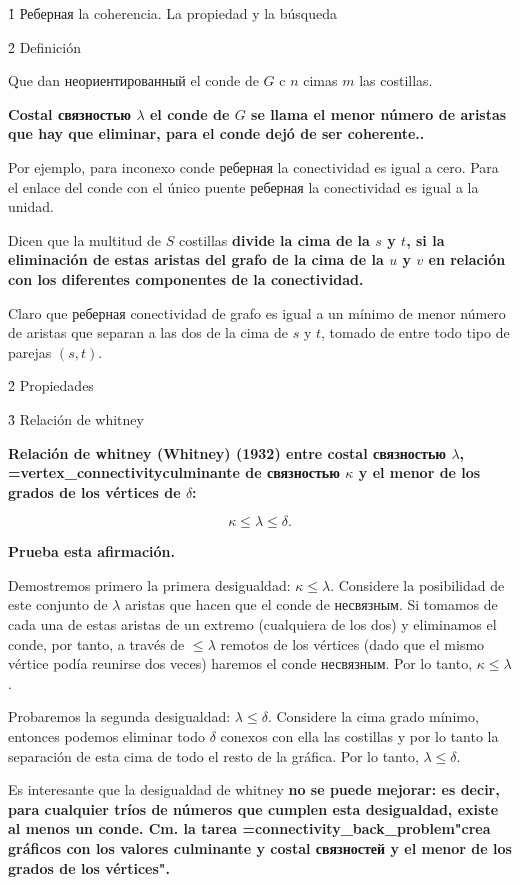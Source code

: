 \h1{ Реберная la coherencia. La propiedad y la búsqueda }


\h2{ Definición }

Que dan неориентированный el conde de $G$ c $n$ cimas $m$ las costillas.

\bf{Costal связностью} $\lambda$ el conde de $G$ se llama el menor número de aristas que hay que eliminar, para el conde dejó de ser coherente..

Por ejemplo, para inconexo conde реберная la conectividad es igual a cero. Para el enlace del conde con el único puente реберная la conectividad es igual a la unidad.

Dicen que la multitud de $S$ costillas \bf{divide} la cima de la $s$ y $t$, si la eliminación de estas aristas del grafo de la cima de la $u$ y $v$ en relación con los diferentes componentes de la conectividad.

Claro que реберная conectividad de grafo es igual a un mínimo de menor número de aristas que separan a las dos de la cima de $s$ y $t$, tomado de entre todo tipo de parejas $(s,t)$.


\h2{ Propiedades }


\h3{ Relación de whitney }

\bf{Relación de whitney (Whitney)} (1932) entre costal связностью $\lambda$, \algohref=vertex_connectivity{culminante de связностью} $\kappa$ y el menor de los grados de los vértices de $\delta$:

$$ \kappa \le \lambda \le \delta. $$

\bf{Prueba} esta afirmación.

Demostremos primero la primera desigualdad: $\kappa \le \lambda$. Considere la posibilidad de este conjunto de $\lambda$ aristas que hacen que el conde de несвязным. Si tomamos de cada una de estas aristas de un extremo (cualquiera de los dos) y eliminamos el conde, por tanto, a través de $\le \lambda$ remotos de los vértices (dado que el mismo vértice podía reunirse dos veces) haremos el conde несвязным. Por lo tanto, $\kappa \le \lambda$.

Probaremos la segunda desigualdad: $\lambda \le \delta$. Considere la cima grado mínimo, entonces podemos eliminar todo $\delta$ conexos con ella las costillas y por lo tanto la separación de esta cima de todo el resto de la gráfica. Por lo tanto, $\lambda \le \delta$.

Es interesante que la desigualdad de whitney \bf{no se puede mejorar}: es decir, para cualquier tríos de números que cumplen esta desigualdad, existe al menos un conde. Cm. la tarea \algohref=connectivity_back_problem{"crea gráficos con los valores culminante y costal связностей y el menor de los grados de los vértices"}.


